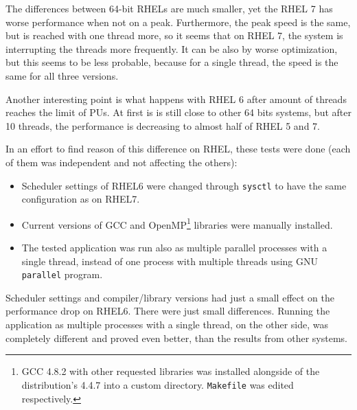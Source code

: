 \par{
The differences between 64-bit RHELs are much smaller, yet the RHEL 7 has worse performance when not on a peak. Furthermore, the peak speed is the same, but is reached with one thread more, so it seems that on RHEL 7, the system is interrupting the threads more frequently. It can be also by worse optimization, but this seems to be less probable, because for a single thread, the speed is the same for all three versions.
}

\par{
Another interesting point is what happens with RHEL 6 after amount of threads reaches the limit of PUs. At first is is still close to other 64 bits systems, but after 10 threads, the performance is decreasing to almost half of RHEL 5 and 7.
}

\par{
In an effort to find reason of this difference on RHEL, these tests were done (each of them was independent and not affecting the others):
\begin{itemize}
\item Scheduler settings of RHEL6 were changed through {\tt sysctl} to have the same configuration as on RHEL7.
\item Current versions of GCC and OpenMP\footnote{GCC 4.8.2 
with other requested libraries was installed alongside of the distribution's 4.4.7 
into a custom directory. {\tt Makefile} was edited respectively.} %
libraries were manually installed.
\item The tested application was run also as multiple parallel processes with a single thread, instead of one process with multiple threads using GNU {\tt parallel} program.
\end{itemize}
}

\par{
Scheduler settings and compiler/library versions had just a small effect 
on the performance drop on RHEL6. There were just small differences. 
Running the application as multiple processes with a single thread, on the other side, was completely different and proved even better, than the results from other systems.
}

